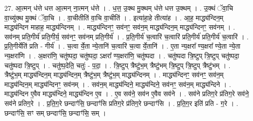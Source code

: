 \documentclass[17pt]{extarticle}
\begin{document}
27. आ॒त्मन् ध॑त्ते धत्त आ॒त्मन् ना॒त्मन् ध॑त्ते । . ध॒त्त॒ उ॒क्थ मु॒क्थम् ध॑त्ते धत्त उ॒क्थम् । . उ॒क्थं ॅवा॒चि वा॒च्यु॑क्थ मु॒क्थं ॅवा॒चि । . वा॒चीतीति॑ वा॒चि वा॒चीति॑ । . इत्या॑हा॒हे तीत्या॑ह । . आ॒ह॒ माद्ध्य॑न्दिन॒म् माद्ध्य॑न्दिन माहाह॒ माद्ध्य॑न्दिनम् । . माद्ध्य॑न्दिनꣳ॒॒ सव॑नꣳ॒॒ सव॑न॒म् माद्ध्य॑न्दिन॒म् माद्ध्य॑न्दिनꣳ॒॒ सव॑नम् । . सव॑नम् प्रति॒गीर्य॑ प्रति॒गीर्य॒ सव॑नꣳ॒॒ सव॑नम् प्रति॒गीर्य॑ । . प्र॒ति॒गीर्य॑ च॒त्वारि॑ च॒त्वारि॑ प्रति॒गीर्य॑ प्रति॒गीर्य॑ च॒त्वारि॑ । . प्र॒ति॒गीर्येति॑ प्रति - गीर्य॑ । . च॒त्वा र्ये॒ता न्ये॒तानि॑ च॒त्वारि॑ च॒त्वा र्ये॒तानि॑ । . ए॒ता न्य॒क्षरा᳚ ण्य॒क्षरा᳚ ण्ये॒ता न्ये॒ता न्य॒क्षरा॑णि । . अ॒क्षरा॑णि॒ चतु॑ष्पदा॒ चतु॑ष्पदा॒ ऽक्षरा᳚ ण्य॒क्षरा॑णि॒ चतु॑ष्पदा । . चतु॑ष्पदा त्रि॒ष्टुप् त्रि॒ष्टुप् चतु॑ष्पदा॒ चतु॑ष्पदा त्रि॒ष्टुप् । . चतु॑ष्प॒देति॒ चतुः॑ - प॒दा॒ । . त्रि॒ष्टुप् त्रैष्टु॑भ॒म् त्रैष्टु॑भम् त्रि॒ष्टुप् त्रि॒ष्टुप् त्रैष्टु॑भम् । . त्रैष्टु॑भ॒म् माद्ध्य॑न्दिन॒म् माद्ध्य॑न्दिन॒म् त्रैष्टु॑भ॒म् त्रैष्टु॑भ॒म् माद्ध्य॑न्दिनम् । . माद्ध्य॑न्दिनꣳ॒॒ सव॑नꣳ॒॒ सव॑न॒म् माद्ध्य॑न्दिन॒म् माद्ध्य॑न्दिनꣳ॒॒ सव॑नम् । . सव॑न॒म् माद्ध्य॑न्दिने॒ माद्ध्य॑न्दिने॒ सव॑नꣳ॒॒ सव॑न॒म् माद्ध्य॑न्दिने । . माद्ध्य॑न्दिन ए॒वैव माद्ध्य॑न्दिने॒ माद्ध्य॑न्दिन ए॒व । . ए॒व सव॑ने॒ सव॑न ए॒वैव सव॑ने । . सव॑ने प्रतिग॒रे प्र॑तिग॒रे सव॑ने॒ सव॑ने प्रतिग॒रे । . प्र॒ति॒ग॒रे छन्दाꣳ॑सि॒ छन्दाꣳ॑सि प्रतिग॒रे प्र॑तिग॒रे छन्दाꣳ॑सि । . प्र॒ति॒ग॒र इति॑ प्रति - ग॒रे । . छन्दाꣳ॑सि॒ सꣳ सम् छन्दाꣳ॑सि॒ छन्दाꣳ॑सि॒ सम् । \newline
\end{document}
